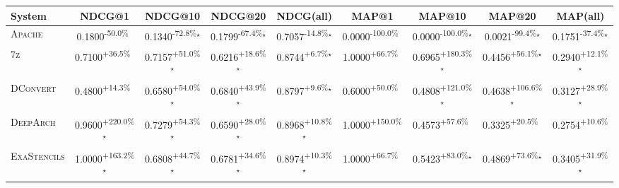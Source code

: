 \begin{table}[htbp]
\centering
\renewcommand{\arraystretch}{1.2}
\begin{tabular}{l|cccc|cccc}
\hline
System & NDCG@1 & NDCG@10 & NDCG@20 & NDCG(all) & MAP@1 & MAP@10 & MAP@20 & MAP(all) \\ \hline
\textsc{Apache} & \cellcolor{red!30}0.1800\textsuperscript{-50.0\%}$^{\,\,\,}$ & \cellcolor{red!30}0.1340\textsuperscript{-72.8\%}$^\star$ & \cellcolor{red!30}0.1799\textsuperscript{-67.4\%}$^\star$ & \cellcolor{red!30}0.7057\textsuperscript{-14.8\%}$^\star$ & \cellcolor{red!30}0.0000\textsuperscript{-100.0\%}$^{\,\,\,}$ & \cellcolor{red!30}0.0000\textsuperscript{-100.0\%}$^\star$ & \cellcolor{red!30}0.0021\textsuperscript{-99.4\%}$^\star$ & \cellcolor{red!30}0.1751\textsuperscript{-37.4\%}$^\star$ \\
\textsc{7z} & \cellcolor{green!30}0.7100\textsuperscript{+36.5\%}$^{\,\,\,}$ & \cellcolor{green!30}0.7157\textsuperscript{+51.0\%}$^\star$ & \cellcolor{green!30}0.6216\textsuperscript{+18.6\%}$^\star$ & \cellcolor{green!30}0.8744\textsuperscript{+6.7\%}$^\star$ & \cellcolor{green!30}1.0000\textsuperscript{+66.7\%}$^{\,\,\,}$ & \cellcolor{green!30}0.6965\textsuperscript{+180.3\%}$^\star$ & \cellcolor{green!30}0.4456\textsuperscript{+56.1\%}$^\star$ & \cellcolor{green!30}0.2940\textsuperscript{+12.1\%}$^\star$ \\
\textsc{DConvert} & \cellcolor{green!30}0.4800\textsuperscript{+14.3\%}$^{\,\,\,}$ & \cellcolor{green!30}0.6580\textsuperscript{+54.0\%}$^\star$ & \cellcolor{green!30}0.6840\textsuperscript{+43.9\%}$^\star$ & \cellcolor{green!30}0.8797\textsuperscript{+9.6\%}$^\star$ & \cellcolor{green!30}0.6000\textsuperscript{+50.0\%}$^{\,\,\,}$ & \cellcolor{green!30}0.4808\textsuperscript{+121.0\%}$^\star$ & \cellcolor{green!30}0.4638\textsuperscript{+106.6\%}$^\star$ & \cellcolor{green!30}0.3127\textsuperscript{+28.9\%}$^\star$ \\
\textsc{DeepArch} & \cellcolor{green!30}0.9600\textsuperscript{+220.0\%}$^\star$ & \cellcolor{green!30}0.7279\textsuperscript{+54.3\%}$^\star$ & \cellcolor{green!30}0.6590\textsuperscript{+28.0\%}$^\star$ & \cellcolor{green!30}0.8968\textsuperscript{+10.8\%}$^\star$ & \cellcolor{green!30}1.0000\textsuperscript{+150.0\%}$^{\,\,\,}$ & \cellcolor{green!30}0.4573\textsuperscript{+57.6\%}$^{\,\,\,}$ & \cellcolor{green!30}0.3325\textsuperscript{+20.5\%}$^{\,\,\,}$ & \cellcolor{green!30}0.2754\textsuperscript{+10.6\%}$^{\,\,\,}$ \\
\textsc{ExaStencils} & \cellcolor{green!30}1.0000\textsuperscript{+163.2\%}$^\star$ & \cellcolor{green!30}0.6808\textsuperscript{+44.7\%}$^\star$ & \cellcolor{green!30}0.6781\textsuperscript{+34.6\%}$^\star$ & \cellcolor{green!30}0.8974\textsuperscript{+10.3\%}$^\star$ & \cellcolor{green!30}1.0000\textsuperscript{+66.7\%}$^{\,\,\,}$ & \cellcolor{green!30}0.5423\textsuperscript{+83.0\%}$^\star$ & \cellcolor{green!30}0.4869\textsuperscript{+73.6\%}$^\star$ & \cellcolor{green!30}0.3405\textsuperscript{+31.9\%}$^\star$ \\

\end{tabular}
\end{table}
